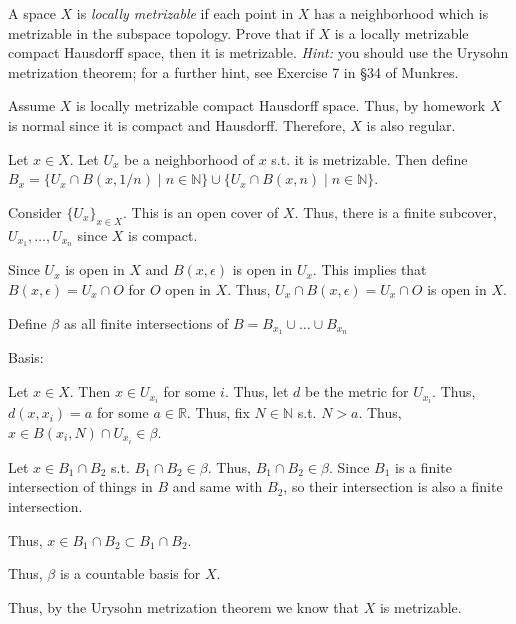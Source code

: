 \documentclass[12pt, letterpaper]{article}
\newcommand{\R}{\mathbb{R}}
\newcommand{\N}{\mathbb{N}}
\begin{document}
\color{\TextColor}
\pagecolor{\colormode}
\setlength{\parindent}{0pt}
\pagestyle{fancy}
\fancyhf{}
\fancyhead[ROE]{\color{\TextColor}\thepage}

\begin{problem}{}
    A space $X$ is \emph{locally metrizable} if each point in $X$ has a
    neighborhood which is metrizable in the subspace topology. Prove
    that if $X$ is a locally metrizable compact Hausdorff space, then it
    is metrizable. \textit{Hint:} you should use the Urysohn metrization
    theorem; for a further hint, see Exercise 7 in \S 34 of Munkres.
\end{problem}
\begin{problemproof}
    Assume $X$ is locally metrizable compact Hausdorff space. Thus, by homework $X$ is normal since it is compact and Hausdorff. Therefore, $X$ is also regular.

    Let $x \in X$. Let $U_x$ be a neighborhood of $x$ s.t. it is metrizable. Then define $B_x=\{U_x \cap B(x,1/n) \mid n \in \N\} \cup \{U_x \cap B(x,n) \mid n \in \N\}$.

    Consider $\{U_x\}_{x \in X}$. This is an open cover of $X$. Thus, there is a finite subcover, $U_{x_1},\dots,U_{x_n}$ since $X$ is compact.

    Since $U_x$ is open in $X$ and $B(x,\epsilon)$ is open in $U_x$. This implies that $B(x,\epsilon)=U_x \cap O$ for $O$ open in $X$. Thus, $U_x \cap B(x,\epsilon)=U_x \cap O$ is open in $X$.

    Define $\beta$ as all finite intersections of $B=B_{x_1} \cup \dots \cup B_{x_n}$

    Basis:

    Let $x \in X$. Then $x \in U_{x_i}$ for some $i$. Thus, let $d$ be the metric for $U_{x_i}$. Thus, $d(x,x_i)=a$ for some $a \in \R$. Thus, fix $N \in \N$ s.t. $N > a$. Thus, $x \in B(x_i,N) \cap U_{x_i} \in \beta$.

    Let $x \in B_1 \cap B_2$ s.t. $B_1 \cap B_2 \in \beta$. Thus, $B_1 \cap B_2 \in \beta$. Since $B_1$ is a finite intersection of things in $B$ and same with $B_2$, so their intersection is also a finite intersection.

    Thus, $x \in B_1 \cap B_2 \subset B_1 \cap B_2$.

    Thus, $\beta$ is a countable basis for $X$.

    Thus, by the Urysohn metrization theorem we know that $X$ is metrizable.
\end{problemproof}
\end{document}
